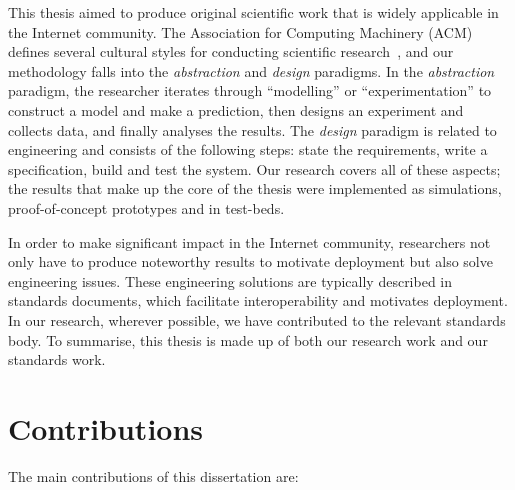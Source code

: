This thesis aimed to produce original scientific work that is widely
applicable in the Internet community. The Association for Computing Machinery
(ACM) defines several cultural styles for conducting scientific
research~\cite{Denning:CS.Method}, and our methodology falls into the
\textit{abstraction} and \textit{design} paradigms. In the \emph{abstraction}
paradigm, the researcher iterates through ``modelling'' or ``experimentation''
to construct a model and make a prediction, then designs an experiment and
collects data, and finally analyses the results. The \emph{design} paradigm is
related to  engineering and consists of the following steps: state the
requirements, write a specification, build and test the system. Our research
covers all of these aspects; the results that make up the core of the thesis
were implemented as simulations, proof-of-concept prototypes and in test-beds. 

In order to make significant impact in the Internet community, researchers not
only have to produce noteworthy results to motivate deployment but also solve
engineering issues. These engineering solutions are typically
described in standards documents, which facilitate interoperability and
motivates deployment. In our research, wherever possible, we have contributed
to the relevant standards body. To summarise, this thesis is made up
of both our research work and our standards work.


\section{Contributions}

The main contributions of this dissertation are:

